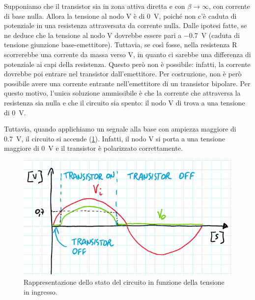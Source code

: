 Supponiamo che il transistor sia in zona attiva diretta e con $\beta\to\infty$, con corrente di base nulla. Allora la tensione al nodo V è di \SI{0}{\volt}, poiché non c'è caduta di potenziale in una resistenza attraversata da corrente nulla. Dalle ipotesi fatte, se ne deduce che la tensione al nodo V dovrebbe essere pari a \SI{-0.7}{\volt} (caduta di tensione giunzione base-emettitore). Tuttavia, se così fosse, nella resistenza R scorrerebbe una corrente da massa verso V, in quanto ci sarebbe una differenza di potenziale ai capi della resistenza. Questo però non è possibile: infatti, la corrente dovrebbe poi entrare nel transistor dall'emettitore. Per costruzione, non è però possibile avere una corrente entrante nell'emettitore di un transistor bipolare. Per questo motivo, l'unica soluzione ammissibile è che la corrente che attraversa la resistenza sia nulla e che il circuito sia spento: il nodo V di trova a una tensione di \SI{0}{\volt}. 

Tuttavia, quando applichiamo un segnale alla base con ampiezza maggiore di \SI{0.7}{\volt}, il circuito si accende (\Fig\ref{fig:emitterfollwer_se_statocircuito}). Infatti, il nodo V si porta a una tensione maggiore di \SI{0}{\volt} e il transistor è polarizzato correttamente.
\begin{figure}[h!]
	\centering
	\includegraphics[width=0.7\linewidth]{./ImageFiles/Laboratorio 2/emitter follower errore soglia}
	\caption{Rappresentazione dello stato del circuito in funzione della tensione in ingresso.}
	\label{fig:emitterfollwer_se_statocircuito}
\end{figure}

